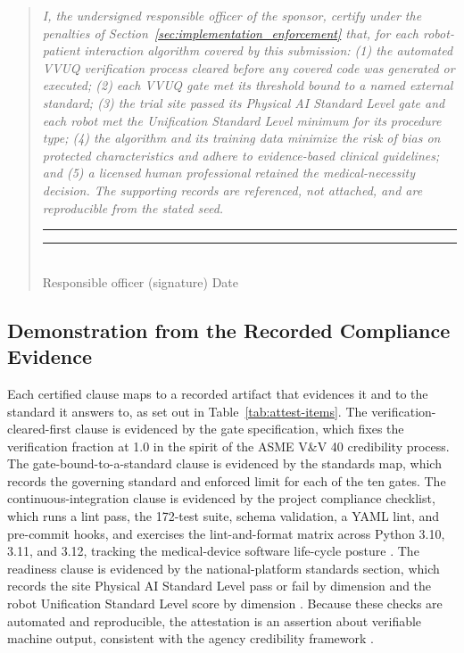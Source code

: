 \begin{quote}
\small\itshape
I, the undersigned responsible officer of the sponsor, certify under the
penalties of Section~\ref{sec:implementation_enforcement} that, for each
robot-patient interaction algorithm covered by this submission: (1) the automated
VVUQ verification process cleared before any covered code was generated or
executed; (2) each VVUQ gate met its threshold bound to a named external
standard; (3) the trial site passed its Physical AI Standard Level gate and each
robot met the Unification Standard Level minimum for its procedure type; (4) the
algorithm and its training data minimize the risk of bias on protected
characteristics and adhere to evidence-based clinical guidelines; and (5) a
licensed human professional retained the medical-necessity decision. The
supporting records are referenced, not attached, and are reproducible from the
stated seed.\par
\medskip
\upshape\rule{6cm}{0.4pt}\quad\rule{3.2cm}{0.4pt}\\
\small Responsible officer (signature)\hspace{1.4cm} Date
\end{quote}

\subsection{Demonstration from the Recorded Compliance Evidence}

Each certified clause maps to a recorded artifact that evidences it and to the
standard it answers to, as set out in Table~\ref{tab:attest-items}. The
verification-cleared-first clause is evidenced by the gate specification, which
fixes the verification fraction at 1.0 in the spirit of the ASME V\&V 40
credibility process. The gate-bound-to-a-standard clause is evidenced by the
standards map, which records the governing standard and enforced limit for each
of the ten gates. The continuous-integration clause is evidenced by the project
compliance checklist, which runs a lint pass, the 172-test suite, schema
validation, a YAML lint, and pre-commit hooks, and exercises the lint-and-format
matrix across Python 3.10, 3.11, and 3.12, tracking the medical-device software
life-cycle posture \cite{iec62304}. The readiness clause is evidenced by the
national-platform standards section, which records the site Physical AI Standard
Level pass or fail by dimension and the robot Unification Standard Level score by
dimension \cite{kawchak2026national}. Because these checks are automated and
reproducible, the attestation is an assertion about verifiable machine output,
consistent with the agency credibility framework \cite{fda2023credibility,
kawchak2026vvuq02}.

